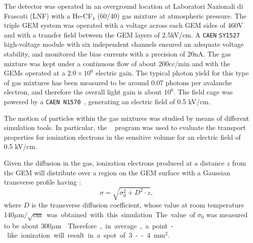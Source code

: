 \documentclass[12pt]{iopart}
\begin{document}
The \lemon detector was operated in an overground location at
Laboratori Nazionali di Frascati (LNF) with a He-CF$_4$ (60/40) gas
mixture at atmospheric pressure. The triple GEM system was operated
with a voltage across each GEM sides of 460\unit{V} and with a
transfer field between the GEM layers of 2.5\unit{kV/cm}.  A
\texttt{CAEN} \texttt {SY1527} high-voltage module with six
independent channels ensured an adequate voltage stability, and
monitored the bias currents with a precision of 20\unit{nA}. The gas
mixture was kept under a continuous flow of about 200\unit{cc/min} and
with the GEMs operated at a $2.0\times10^6$ electric gain. The typical
photon yield for this type of gas mixtures has been measured to be
around 0.07 photons per avalanche electron\cite{bib:jinst_orange1,
  bib:roby, bib:tesinatalia}, and therefore the overall light gain is
about $10^6$. The field cage was powered by a
\texttt{CAEN~N1570}~\cite{CAENN1570}, generating an electric field of
0.5 \unit{kV/cm}.
  
The motion of particles within the gas mixtures was studied by means
of different simulation tools. In particular, the 
\garfield~\cite{bib:garfield,bib:garfield1} program was used to
evaluate the transport properties for ionization electrons in the
sensitive volume for an electric field of  0.5 \unit{kV/cm}.

Given the diffusion in the gas, ionization electrons produced at a
distance $z$ from the GEM will distribute over a region on the GEM
surface with  a Gaussian transverse profile having : 
%
\begin{equation}
\label{eq:diff}
\sigma = \sqrt{\sigma^2_0 +  D^2 \cdot z},
\end{equation}
where $D$ is the transverse diffusion coefficient, whose value at room
temperature 140\unit{$\mu{\mathrm{m}}/\sqrt{\mathrm{cm}}$} was
obtained with this simulation.  The value of $\sigma_0$ was measured to
be about 300\unit{$\mu$m} \cite{bib:btf,bib:fe55New}. Therefore, in
average, a point-like ionization will result in a spot of
3--4\unit{mm$^2$}.
\end{document}
